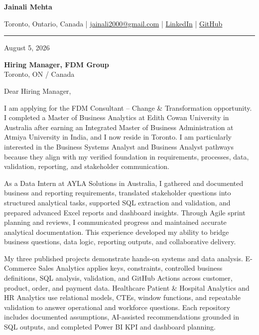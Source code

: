 \documentclass[letterpaper,10pt]{article}
\begin{document}
\begin{center}
  {\fontsize{17}{19}\selectfont\textbf{Jainali Mehta}}\par\vspace{2pt}
  \small Toronto, Ontario, Canada \;|\;
  \href{mailto:jainali2000@gmail.com}{jainali2000@gmail.com} \;|\;
  \href{https://www.linkedin.com/in/jainali-mehta}{LinkedIn} \;|\;
  \href{https://github.com/jainalimehta}{GitHub}
\end{center}
\vspace{-5pt}
\noindent\rule{\textwidth}{0.4pt}

August 5, 2026

\textbf{Hiring Manager, FDM Group}\\
Toronto, ON / Canada

Dear Hiring Manager,

I am applying for the FDM Consultant -- Change \& Transformation opportunity. I completed a Master of Business Analytics at Edith Cowan University in Australia after earning an Integrated Master of Business Administration at Atmiya University in India, and I now reside in Toronto. I am particularly interested in the Business Systems Analyst and Business Analyst pathways because they align with my verified foundation in requirements, processes, data, validation, reporting, and stakeholder communication.

As a Data Intern at AYLA Solutions in Australia, I gathered and documented business and reporting requirements, translated stakeholder questions into structured analytical tasks, supported SQL extraction and validation, and prepared advanced Excel reports and dashboard insights. Through Agile sprint planning and reviews, I communicated progress and maintained accurate analytical documentation. This experience developed my ability to bridge business questions, data logic, reporting outputs, and collaborative delivery.

My three published projects demonstrate hands-on systems and data analysis. E-Commerce Sales Analytics applies keys, constraints, controlled business definitions, SQL analysis, validation, and GitHub Actions across customer, product, order, and payment data. Healthcare Patient \& Hospital Analytics and HR Analytics use relational models, CTEs, window functions, and repeatable validation to answer operational and workforce questions. Each repository includes documented assumptions, AI-assisted recommendations grounded in SQL outputs, and completed Power BI KPI and dashboard planning.
\end{document}
